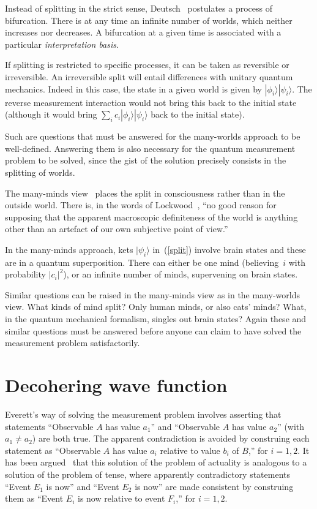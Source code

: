 \documentclass[12pt]{article}
\begin{document}
Instead of splitting in the strict sense,
Deutsch~\cite{deutsch2} postulates a process of
bifurcation.  There is at any time an infinite number
of worlds, which neither increases nor decreases.
A bifurcation at a given time is associated with a
particular \emph{interpretation basis}.

If splitting is restricted to specific processes,
it can be taken as reversible or irreversible.
An irreversible split will entail differences
with unitary quantum mechanics.  Indeed in this
case, the state in a given world is given by
$|\phi_i\rangle |\psi_i\rangle$.  The reverse
measurement interaction would not bring this back
to the initial state (although it would bring
$\sum_i c_i |\phi_i\rangle |\psi_i\rangle$
back to the initial state).

Such are questions that must be answered for
the many-worlds approach to be well-defined.
Answering them is also necessary for the quantum
measurement problem to be solved, since the gist of
the solution precisely consists in the splitting
of worlds.

The many-minds view~\cite{albert} places the split in
consciousness rather than in the outside world.
There is, in the words of Lockwood~\cite{lockwood},
``no good reason for supposing
that the apparent macroscopic definiteness of
the world is anything other than an artefact
of our own subjective point of view.''

In the many-minds approach, kets $|\psi _i\rangle$
in~(\ref{split}) involve brain states and these
are in a quantum superposition.  There can either
be one mind (believing~$i$ with probability
$|c_i|^2$), or an infinite number of minds,
supervening on brain states.

Similar questions can be raised in the many-minds
view as in the many-worlds view.  What kinds of
mind split?  Only human minds, or also cats' minds?
What, in the quantum mechanical formalism, singles out
brain states?  Again these and similar questions must
be answered before anyone can claim to have solved
the measurement problem satisfactorily.
%
\section{Decohering wave function}
\label{sec4}
%
Everett's way of solving the measurement problem
involves asserting that statements ``Observable
$A$ has value $a_1$'' and ``Observable $A$ has
value $a_2$'' (with $a_1 \neq a_2$) are both
true.  The apparent contradiction is avoided
by construing each statement as ``Observable
$A$ has value $a_i$ relative to value $b_i$
of $B$,'' for $i = 1, 2$.  It has been
argued~\cite{saunders,wallace1} that this
solution of the problem of actuality is
analogous to a solution of the problem of
tense, where apparently contradictory
statements ``Event $E_1$ is now'' and
``Event $E_2$ is now'' are made consistent
by construing them as ``Event $E_i$ is now
relative to event $F_i$,'' for $i = 1, 2$.
\end{document}
